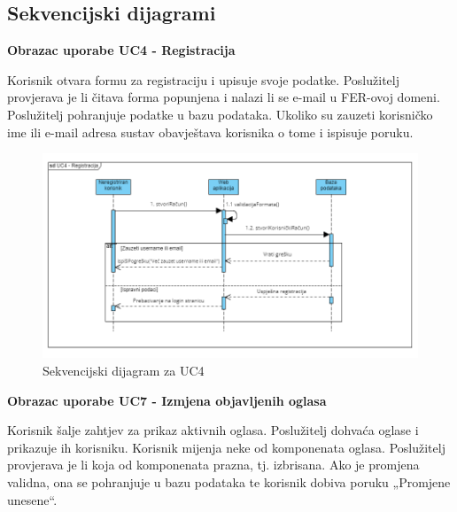 			\eject
				
			\subsection{Sekvencijski dijagrami}
			
					\noindent \textbf{Obrazac uporabe UC4 - Registracija}
					
					\noindent Korisnik otvara formu za registraciju i upisuje svoje podatke. Poslužitelj provjerava je li čitava forma popunjena i nalazi li se e-mail u FER-ovoj domeni. Poslužitelj pohranjuje podatke u bazu podataka.  Ukoliko su zauzeti korisničko ime ili e-mail adresa sustav obavještava korisnika o tome i ispisuje poruku.
					
					\begin{figure}[H]
						\includegraphics[scale=0.7]{dijagrami/SD_registracija.png}
						\centering
						\caption{Sekvencijski dijagram za UC4}
						\label{fig:SD_registracija}
					\end{figure}
					
			\eject
			
					\noindent \textbf{Obrazac uporabe UC7 - Izmjena objavljenih oglasa}
					
					\noindent Korisnik šalje zahtjev za prikaz aktivnih oglasa. Poslužitelj dohvaća oglase i prikazuje ih korisniku. Korisnik mijenja neke od komponenata oglasa. Poslužitelj provjerava je li koja od komponenata prazna, tj. izbrisana. Ako je promjena validna, ona se pohranjuje u bazu podataka te korisnik dobiva poruku „Promjene unesene“.
					
